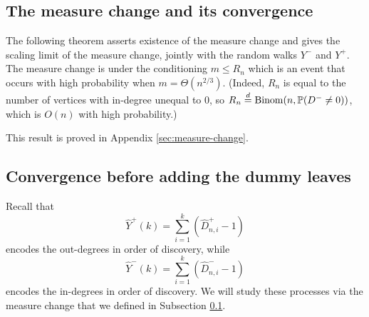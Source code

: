 \subsection{The measure change and its convergence}\label{subsec.measurechange}

The following theorem asserts existence of the measure change and gives the scaling limit of the measure change, jointly with the random walks $Y^-$ and $Y^+$. The measure change is under the conditioning $m \leq R_n$ which is an event that occurs with high probability when $m = \Theta(n^{2/3})$. (Indeed, $R_n$ is equal to the number of vertices with in-degree unequal to $0$, so $R_n\overset{d}{=}\mathrm{Binom}(n,\P(D^-\neq 0))$, which is $O(n)$ with high probability.)



This result is proved in Appendix \ref{sec:measure-change}. 

\subsection{Convergence before adding the dummy leaves}
Recall that
$$ \hat{Y}^+(k)=\sum\limits_{i=1}^k (\hat{D}^+_{n,i}-1)$$
encodes the out-degrees in order of discovery, while 
$$ \hat{Y}^-(k)=\sum\limits_{i=1}^k (\hat{D}^-_{n,i}-1)$$
encodes the in-degrees in order of discovery.
 We will study these processes via the measure change that we defined in Subsection \ref{subsec.measurechange}. 
 

